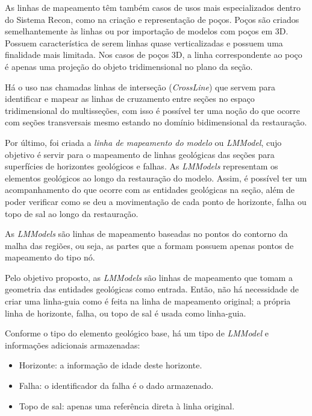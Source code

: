 As linhas de mapeamento têm também casos de usos mais especializados dentro do Sistema Recon, como na criação e representação de poços. Poços são criados semelhantemente às linhas ou por importação de modelos com poços em 3D. Possuem característica de serem linhas quase verticalizadas e possuem uma finalidade mais limitada. Nos casos de poços 3D, a linha correspondente ao poço é apenas uma projeção do objeto tridimensional no plano da seção.

Há o uso nas chamadas linhas de interseção (\textit{CrossLine}) que servem para identificar e mapear as linhas de cruzamento entre seções no espaço tridimensional do multisseções, com isso é possível ter uma noção do que ocorre com seções transversais mesmo estando no domínio bidimensional da restauração.

Por último, foi criada a \textit{linha de mapeamento do modelo} ou \textit{LMModel}, cujo objetivo é servir para o mapeamento de linhas geológicas das seções para superfícies de horizontes geológicos e falhas. As \emph{LMModels} representam os elementos geológicos ao longo da restauração do modelo. Assim, é possível ter um acompanhamento do que ocorre com as entidades geológicas na seção, além de poder verificar como se deu a movimentação de cada ponto de horizonte, falha ou topo de sal ao longo da restauração.

As \textit{LMModels} são linhas de mapeamento baseadas no pontos do contorno da malha das regiões, ou seja, as partes que a formam possuem apenas pontos de mapeamento do tipo nó.

Pelo objetivo proposto, as \textit{LMModels} são linhas de mapeamento que tomam a geometria das entidades geológicas como entrada. Então, não há necessidade de criar uma linha-guia como é feita na linha de mapeamento original; a própria linha de horizonte, falha, ou topo de sal é usada como linha-guia.

Conforme o tipo do elemento geológico base, há um tipo de \textit{LMModel} e informações adicionais armazenadas:

\renewcommand{\labelitemi}{•}
\begin{itemize}
  \item Horizonte: a informação de idade deste horizonte.
  \item Falha: o identificador da falha é o dado armazenado.
  \item Topo de sal: apenas uma referência direta à linha original.
\end{itemize}

